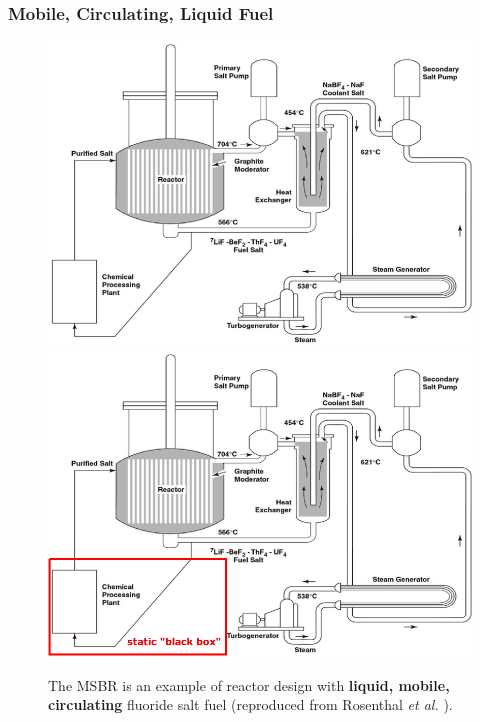 \begin{frame} %
\frametitle{Mobile, Circulating, Liquid Fuel}
\vspace{-2mm}
\begin{figure}[t]
		\begin{overprint}
			\includegraphics[height=0.6\textwidth]{./images/msbr_scheme.png}
			\onslide<2>\includegraphics[height=0.6\textwidth]{./images/msbr_scheme_box.png}
		\end{overprint}
	\caption{The \gls{MSBR} is an example of reactor design with 
	\textbf{liquid, mobile, circulating} fluoride salt fuel 
	(reproduced from Rosenthal \emph{et al.} 
	\cite{rosenthal_molten-salt_1970}).}
\end{figure}   

\end{frame}


